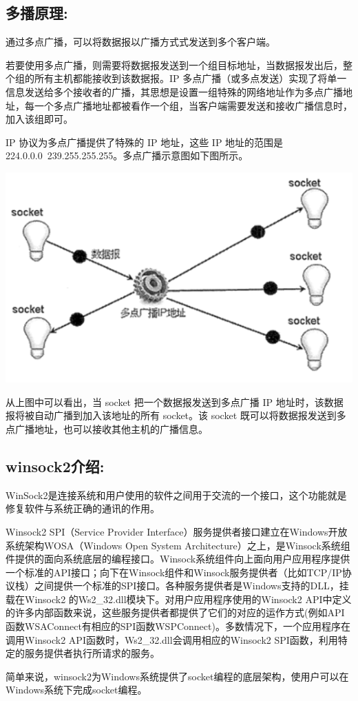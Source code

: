 \documentclass[UTF8]{ctexart}
\begin{document}
\subsection{多播原理:}{通过多点广播，可以将数据报以广播方式式发送到多个客户端。\par{若要使用多点广播，则需要将数据报发送到一个组目标地址，当数据报发出后，整个组的所有主机都能接收到该数据报。IP 多点广播（或多点发送）实现了将单一信息发送给多个接收者的广播，其思想是设置一组特殊的网络地址作为多点广播地址，每一个多点广播地址都被看作一个组，当客户端需要发送和接收广播信息时，加入该组即可。}\par{IP 协议为多点广播提供了特殊的 IP 地址，这些 IP 地址的范围是 224.0.0.0~239.255.255.255。多点广播示意图如下图所示。}
}
\par\centerline{\includegraphics[scale=0.6]{fig1.png}}
\par{从上图中可以看出，当 socket 把一个数据报发送到多点广播 IP 地址时，该数据报将被自动广播到加入该地址的所有 socket。该 socket 既可以将数据报发送到多点广播地址，也可以接收其他主机的广播信息。
}

\subsection{winsock2介绍:}{WinSock2是连接系统和用户使用的软件之间用于交流的一个接口，这个功能就是修复软件与系统正确的通讯的作用。}
\par{Winsock2 SPI（Service Provider Interface）服务提供者接口建立在Windows开放系统架构WOSA（Windows Open System Architecture）之上，是Winsock系统组件提供的面向系统底层的编程接口。Winsock系统组件向上面向用户应用程序提供一个标准的API接口；向下在Winsock组件和Winsock服务提供者（比如TCP/IP协议栈）之间提供一个标准的SPI接口。各种服务提供者是Windows支持的DLL，挂载在Winsock2 的Ws2\_{}32.dll模块下。对用户应用程序使用的Winsock2 API中定义的许多内部函数来说，这些服务提供者都提供了它们的对应的运作方式(例如API函数WSAConnect有相应的SPI函数WSPConnect)。多数情况下，一个应用程序在调用Winsock2 API函数时，Ws2\_{}32.dll会调用相应的Winsock2 SPI函数，利用特定的服务提供者执行所请求的服务。}
\par{简单来说，winsock2为Windows系统提供了socket编程的底层架构，使用户可以在Windows系统下完成socket编程。}
\end{document}
